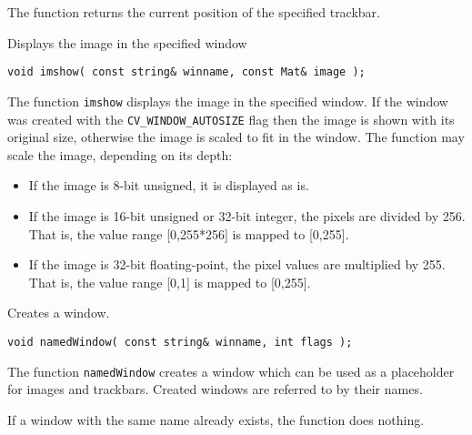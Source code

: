 The function returns the current position of the specified trackbar.


Displays the image in the specified window

\begin{lstlisting}
void imshow( const string& winname, const Mat& image );
\end{lstlisting}
\begin{description}
\end{description}

The function \texttt{imshow} displays the image in the specified window. If the window was created with the \texttt{CV\_WINDOW\_AUTOSIZE} flag then the image is shown with its original size, otherwise the image is scaled to fit in the window. The function may scale the image, depending on its depth:
\begin{itemize}
    \item If the image is 8-bit unsigned, it is displayed as is.
    \item If the image is 16-bit unsigned or 32-bit integer, the pixels are divided by 256. That is, the value range [0,255*256] is mapped to [0,255].
    \item If the image is 32-bit floating-point, the pixel values are multiplied by 255. That is, the value range [0,1] is mapped to [0,255].
\end{itemize}


Creates a window.

\begin{lstlisting}
void namedWindow( const string& winname, int flags );
\end{lstlisting}
\begin{description}
\end{description}

The function \texttt{namedWindow} creates a window which can be used as a placeholder for images and trackbars. Created windows are referred to by their names.

If a window with the same name already exists, the function does nothing.


